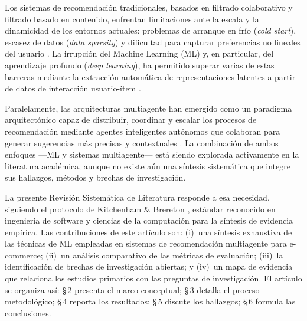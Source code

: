 \documentclass[12pt, a4paper]{article}
\newcommand{\RSL}{Revisi\'on Sistem\'atica de Literatura}
\begin{document}
Los sistemas de recomendaci\'on tradicionales, basados en filtrado colaborativo
y filtrado basado en contenido, enfrentan limitaciones ante la escala y la
dinamicidad de los entornos actuales: problemas de arranque en fr\'io
(\textit{cold start}), escasez de datos (\textit{data sparsity}) y dificultad
para capturar preferencias no lineales del usuario \cite{Loukili2023,
Alam2025}. La irrupci\'on del Machine Learning (ML) y, en particular, del
aprendizaje profundo (\textit{deep learning}), ha permitido superar varias de
estas barreras mediante la extracci\'on autom\'atica de representaciones
latentes a partir de datos de interacci\'on usuario-\'item \cite{Nagraj2024,
Lampa2024}.

Paralelamente, las arquitecturas multiagente han emergido como un paradigma
arquitect\'onico capaz de distribuir, coordinar y escalar los procesos de
recomendaci\'on mediante agentes inteligentes aut\'onomos que colaboran para
generar sugerencias m\'as precisas y contextuales \cite{Alhejaili2021,
Zhang2025DARLR}. La combinaci\'on de ambos enfoques ---ML y sistemas
multiagente--- est\'a siendo explorada activamente en la literatura acad\'emica,
aunque no existe a\'un una s\'intesis sistem\'atica que integre sus hallazgos,
m\'etodos y brechas de investigaci\'on.

La presente \RSL{} responde a esa necesidad, siguiendo el protocolo de
Kitchenham \& Brereton \cite{Kitchenham2007}, est\'andar reconocido en
ingenier\'ia de software y ciencias de la computaci\'on para la s\'intesis de
evidencia emp\'irica. Las contribuciones de este art\'iculo son: (i)~una
s\'intesis exhaustiva de las t\'ecnicas de ML empleadas en sistemas de
recomendaci\'on multiagente para e-commerce; (ii)~un an\'alisis comparativo de
las m\'etricas de evaluaci\'on; (iii)~la identificaci\'on de brechas de
investigaci\'on abiertas; y (iv)~un mapa de evidencia que relaciona los estudios
primarios con las preguntas de investigaci\'on. El art\'iculo se organiza as\'i:
\S\,2 presenta el marco conceptual; \S\,3 detalla el proceso metodol\'ogico;
\S\,4 reporta los resultados; \S\,5 discute los hallazgos; \S\,6 formula las
conclusiones.
\end{document}
